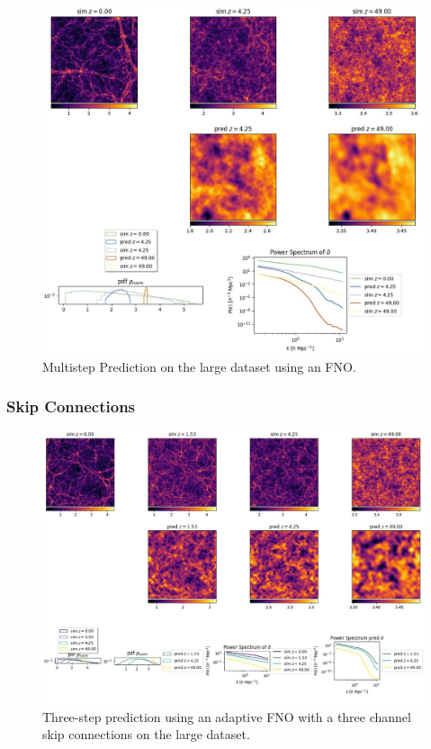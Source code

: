 \documentclass{article}
\begin{document}
\begin{figure}[h]
    \centering
    \includegraphics[width=0.9\linewidth]{img/multistep_large.jpg}
    \caption{Multistep Prediction on the large dataset using an FNO.}
    \label{fig:multistep}
\end{figure}


\subsubsection{Skip Connections}


\begin{figure}[h]
    \centering
    \includegraphics[width=0.9\linewidth]{img/prediction_sequential(1).jpg}
    \caption{Three-step prediction using an adaptive FNO with a three channel skip connections on the large dataset.}
    \label{fig:mss}
\end{figure}
\end{document}
